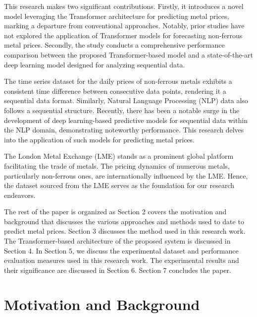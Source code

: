 \documentclass[preprint,12pt]{elsarticle}
\begin{document}
\par This research makes two significant contributions. Firstly, it introduces a novel model leveraging the Transformer architecture for predicting metal prices, marking a departure from conventional approaches. Notably, prior studies have not explored the application of Transformer models for forecasting non-ferrous metal prices. Secondly, the study conducts a comprehensive performance comparison between the proposed Transformer-based model and a state-of-the-art deep learning model designed for analyzing sequential data.
\par The time series dataset for the daily prices of non-ferrous metals exhibits a consistent time difference between consecutive data points, rendering it a sequential data format. Similarly, Natural Language Processing (NLP) data also follows a sequential structure. Recently, there has been a notable surge in the development of deep learning-based predictive models for sequential data within the NLP domain, demonstrating noteworthy performance. This research delves into the application of such models for predicting metal prices.
\par The London Metal Exchange (LME) stands as a prominent global platform facilitating the trade of metals. The pricing dynamics of numerous metals, particularly non-ferrous ones, are internationally influenced by the LME. Hence, the dataset sourced from the LME serves as the foundation for our research endeavors.
\par The rest of the paper is organized as Section 2 covers the motivation and background that discusses the various approaches and methods used to date to predict metal prices. Section 3 discusses the method used in this research work. The Transformer-based architecture of the proposed system is discussed in Section 4. In Section 5, we discuss the experimental dataset and performance evaluation measures used in this research work. The experimental results and their significance are discussed in Section 6. Section 7 concludes the paper.


\section{Motivation and Background}
\end{document}
